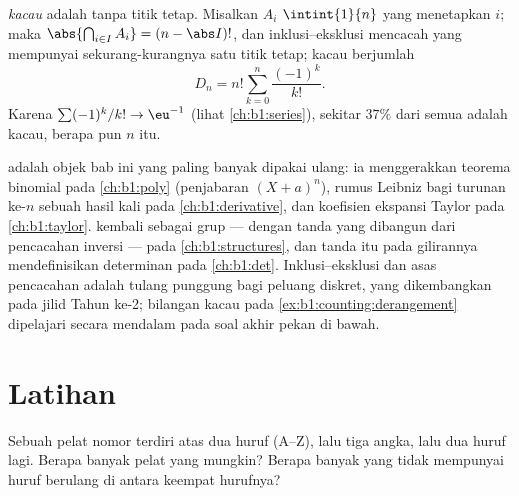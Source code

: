 \begin{example}\label{ex:b1:counting:derangement}
\emph{ kacau} adalah  tanpa titik tetap. Misalkan $A_i$
  $\intint{1}{n}$ yang menetapkan $i$;
maka $\abs{\bigcap_{i \in I} A_i} = (n - \abs I)!$, dan
inklusi--eksklusi mencacah  yang mempunyai sekurang-kurangnya satu
titik tetap;  kacau berjumlah
\[
D_n = n! \sum_{k=0}^{n} \frac{(-1)^k}{k!} .
\]
Karena $\sum (-1)^k / k! \to \eu^{-1}$ (lihat \cref{ch:b1:series}), sekitar
$37\%$ dari semua  adalah  kacau, berapa pun $n$ itu.
\end{example}

\begin{remark}\label{rem:b1:counting:whereused}
 adalah objek bab ini yang paling banyak dipakai ulang:
ia menggerakkan teorema binomial pada \cref{ch:b1:poly}
(penjabaran $(X + a)^n$), rumus Leibniz bagi turunan ke-$n$ sebuah
hasil kali pada \cref{ch:b1:derivative}, dan
koefisien ekspansi Taylor pada \cref{ch:b1:taylor}.
 kembali sebagai grup --- dengan tanda yang dibangun dari
pencacahan inversi --- pada \cref{ch:b1:structures}, dan
tanda itu pada gilirannya mendefinisikan determinan pada \cref{ch:b1:det}.
Inklusi--eksklusi dan asas pencacahan adalah tulang punggung 
bagi peluang diskret, yang dikembangkan pada jilid Tahun ke-2;
bilangan  kacau pada \cref{ex:b1:counting:derangement}
dipelajari secara mendalam pada soal akhir pekan di bawah.
\end{remark}

\section{Latihan}

\begin{exercise}[$\star$]\label{exo:b1:counting:1}
Sebuah pelat nomor terdiri atas dua huruf (A--Z), lalu tiga angka, lalu
dua huruf lagi. Berapa banyak pelat yang mungkin? Berapa banyak yang tidak
mempunyai huruf berulang di antara keempat hurufnya?
\end{exercise}

